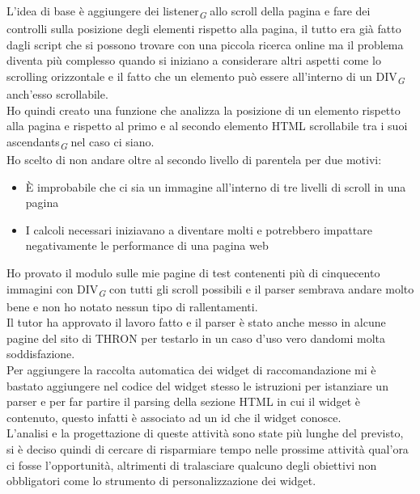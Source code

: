 \documentclass[a4paper, 12pt, twoside, openright]{book}
\newcommand{\gloss}[1]{#1\textsubscript{\textit{\tiny{G}}}}
\begin{document}
L'idea di base è aggiungere dei \gloss{listener} allo scroll della pagina e fare dei controlli sulla posizione degli elementi rispetto alla pagina, il tutto era già fatto dagli script che si possono trovare con una piccola ricerca online ma il problema diventa più complesso quando si iniziano a considerare altri aspetti come lo scrolling orizzontale e il fatto che un elemento può essere all'interno di un \gloss{DIV} anch'esso scrollabile.\\
Ho quindi creato una funzione che analizza la posizione di un elemento rispetto alla pagina e rispetto al primo e al secondo elemento HTML scrollabile tra i suoi \gloss{ascendants} nel caso ci siano.\\
Ho scelto di non andare oltre al secondo livello di parentela per due motivi:
\begin{itemize}
	\item \`{E} improbabile che ci sia un immagine all'interno di tre livelli di scroll in una pagina
	\item I calcoli necessari iniziavano a diventare molti e potrebbero impattare negativamente le performance di una pagina web
\end{itemize} 
Ho provato il modulo sulle mie pagine di test contenenti più di cinquecento immagini con \gloss{DIV} con tutti gli scroll possibili e il parser sembrava andare molto bene e non ho notato nessun tipo di rallentamenti.\\
Il tutor ha approvato il lavoro fatto e il parser è stato anche messo in alcune pagine del sito di THRON per testarlo in un caso d'uso vero dandomi molta soddisfazione.\\
Per aggiungere la raccolta automatica dei widget di raccomandazione mi è bastato aggiungere nel codice del widget stesso le istruzioni per istanziare un parser e per far partire il parsing della sezione HTML in cui il widget è contenuto, questo infatti è associato ad un id che il widget conosce.\\
L'analisi e la progettazione di queste attività sono state più lunghe del previsto, si è deciso quindi di cercare di risparmiare tempo nelle prossime attività qual'ora ci fosse l'opportunità, altrimenti di tralasciare qualcuno degli obiettivi non obbligatori come lo strumento di personalizzazione dei widget.
\end{document}
